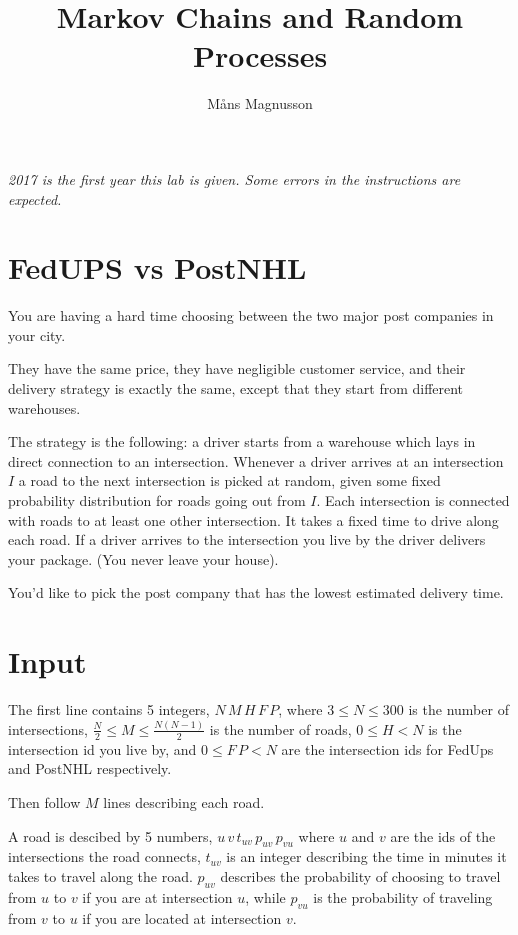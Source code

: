 \documentclass{tufte-handout}
\title{\sf Markov Chains and Random Processes}
\date{\GITAuthorDate}
\author{M\aa ns Magnusson}
\begin{document}
\maketitle
{}

\emph{2017 is the first year this lab is given. Some errors in the instructions are expected.}

\section{FedUPS vs PostNHL}

You are having a hard time choosing between the two major post companies in your city.

\medskip

They have the same price, they have negligible customer service, 
and their delivery strategy is exactly the same, except that they start from different warehouses.

The strategy is the following: a driver starts from a warehouse which lays in direct connection to an intersection. 
Whenever a driver arrives at an intersection $I$ a road to the next intersection is picked at random, given some fixed probability distribution for roads going out from $I$. 
Each intersection is connected with roads to at least one other intersection. It takes a fixed time to drive along each road. 
If a driver arrives to the intersection you live by the driver delivers your package. (You never leave your house).

\medskip

You'd like to pick the post company that has the lowest estimated delivery time.


\section*{Input}
The first line contains 5 integers, $N\, M\, H\, F\, P$, where $3 \leq N \leq 300$ is the number of intersections, 
$\frac{N}{2} \leq M \leq \frac{N(N-1)}{2}$ is the number of roads, $0 \leq H < N$ is the intersection id you live by, and 
$0 \leq F\, P < N$ are the intersection ids for FedUps and PostNHL respectively. 

\medskip

Then follow $M$ lines describing each road.

\medskip

A road is descibed by 5 numbers, $u\, v\, t_{uv}\, p_{uv} \, p_{vu}$ where $u$ and $v$ are the ids of the intersections the road connects, 
$t_{uv}$ is an integer describing the time in minutes it takes to travel along the road. 
$p_{uv}$ describes the probability of choosing to travel from $u$ to $v$ if you are at intersection $u$, 
while $p_{vu}$ is the probability of traveling from $v$ to $u$ if you are located at intersection $v$.
\end{document}
